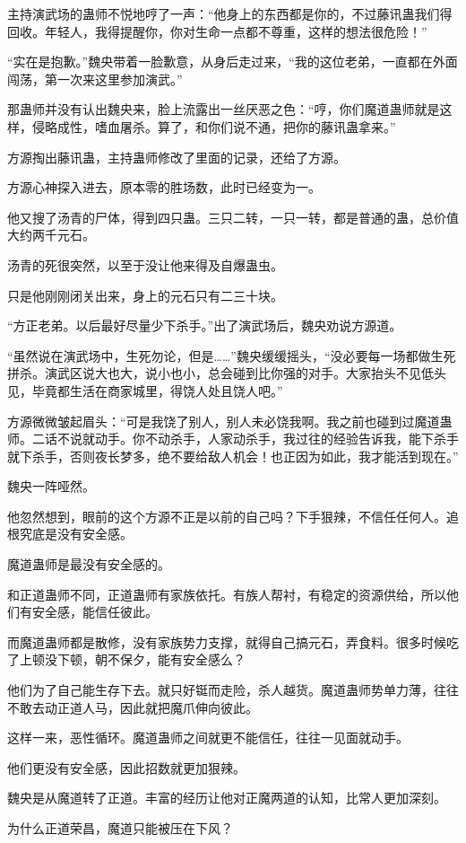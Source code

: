 \begin{this_body}
主持演武场的蛊师不悦地哼了一声：“他身上的东西都是你的，不过藤讯蛊我们得回收。年轻人，我得提醒你，你对生命一点都不尊重，这样的想法很危险！”

“实在是抱歉。”魏央带着一脸歉意，从身后走过来，“我的这位老弟，一直都在外面闯荡，第一次来这里参加演武。”

那蛊师并没有认出魏央来，脸上流露出一丝厌恶之色：“哼，你们魔道蛊师就是这样，侵略成性，嗜血屠杀。算了，和你们说不通，把你的藤讯蛊拿来。”

方源掏出藤讯蛊，主持蛊师修改了里面的记录，还给了方源。

方源心神探入进去，原本零的胜场数，此时已经变为一。

他又搜了汤青的尸体，得到四只蛊。三只二转，一只一转，都是普通的蛊，总价值大约两千元石。

汤青的死很突然，以至于没让他来得及自爆蛊虫。

只是他刚刚闭关出来，身上的元石只有二三十块。

“方正老弟。以后最好尽量少下杀手。”出了演武场后，魏央劝说方源道。

“虽然说在演武场中，生死勿论，但是……”魏央缓缓摇头，“没必要每一场都做生死拼杀。演武区说大也大，说小也小，总会碰到比你强的对手。大家抬头不见低头见，毕竟都生活在商家城里，得饶人处且饶人吧。”

方源微微皱起眉头：“可是我饶了别人，别人未必饶我啊。我之前也碰到过魔道蛊师。二话不说就动手。你不动杀手，人家动杀手，我过往的经验告诉我，能下杀手就下杀手，否则夜长梦多，绝不要给敌人机会！也正因为如此，我才能活到现在。”

魏央一阵哑然。

他忽然想到，眼前的这个方源不正是以前的自己吗？下手狠辣，不信任任何人。追根究底是没有安全感。

魔道蛊师是最没有安全感的。

和正道蛊师不同，正道蛊师有家族依托。有族人帮衬，有稳定的资源供给，所以他们有安全感，能信任彼此。

而魔道蛊师都是散修，没有家族势力支撑，就得自己搞元石，弄食料。很多时候吃了上顿没下顿，朝不保夕，能有安全感么？

他们为了自己能生存下去。就只好铤而走险，杀人越货。魔道蛊师势单力薄，往往不敢去动正道人马，因此就把魔爪伸向彼此。

这样一来，恶性循环。魔道蛊师之间就更不能信任，往往一见面就动手。

他们更没有安全感，因此招数就更加狠辣。

魏央是从魔道转了正道。丰富的经历让他对正魔两道的认知，比常人更加深刻。

为什么正道荣昌，魔道只能被压在下风？


\end{this_body}
